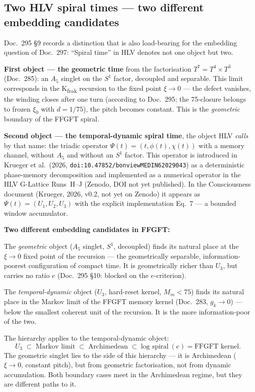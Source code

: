 \subsection*{Two HLV spiral times --- two different embedding candidates}

Doc.~295 §9 records a distinction that is also load-bearing for the
embedding question of Doc.~297: \enquote{Spiral time} in HLV denotes not
one object but two.

\textbf{First object --- the geometric time} from the factorisation
$T^7 = T^4 \times T^3$ (Doc.~285): an $A_5$ singlet on the $S^1$ factor,
decoupled and separable. This limit corresponds in the
K\textsubscript{frak} recursion to the fixed point $\xi \to 0$ --- the
defect vanishes, the winding closes after one turn (according to Doc.~295; the 75-closure belongs to frozen $\xi_0$ with
$d=1/75$), the pitch becomes
constant. This is the \emph{geometric} boundary of the FFGFT spiral.

\textbf{Second object --- the temporal-dynamic spiral time}, the object
HLV \emph{calls} by that name: the triadic operator
$\Psi(t) = (t, \phi(t), \chi(t))$ with a memory channel, without $A_5$
and without an $S^1$ factor. This operator is introduced in Krueger et
al.\ (2026, \texttt{doi:10.47852/bonviewMEDIN62029043}) as a deterministic
phase-memory decomposition and implemented as a numerical operator in the
HLV G-Lattice Runs~H--J (Zenodo, DOI not yet published). In the
Consciousness document (Krueger, 2026, v0.2, not yet on Zenodo) it appears
as $\Psi(t) = (U_1, U_2, U_3)$ with the explicit implementation Eq.~7 ---
a bounded window accumulator.

\textbf{Two different embedding candidates in FFGFT:}

The \emph{geometric} object ($A_5$ singlet, $S^1$, decoupled) finds its
natural place at the $\xi \to 0$ fixed point of the recursion --- the
geometrically separable, information-poorest configuration of compact time.
It is geometrically richer than $U_3$, but carries no ratio $e$ (Doc.~295
§10: blocked on the $e$-criterion).

The \emph{temporal-dynamic} object ($U_3$, hard-reset kernel, $M_m < 75$)
finds its natural place in the Markov limit of the FFGFT memory kernel
(Doc.~283, $g_k \to 0$) --- below the smallest coherent unit of the
recursion. It is the more information-poor of the two.

The hierarchy applies to the temporal-dynamic object:
\[
  U_3 \;\subset\; \text{Markov limit} \;\subset\;
  \text{Archimedean} \;\subset\; \text{log spiral}~(e)
  = \text{FFGFT kernel}.
\]
The geometric singlet lies to the side of this hierarchy --- it is
Archimedean ($\xi \to 0$, constant pitch), but from geometric
factorisation, not from dynamic accumulation. Both boundary cases meet in
the Archimedean regime, but they are different paths to it.

